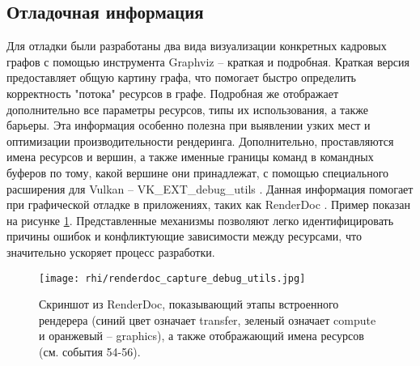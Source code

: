 \subsection{Отладочная информация}
Для отладки были разработаны два вида визуализации конкретных кадровых графов с помощью инструмента Graphviz \cite{graphviz} -- краткая и подробная. Краткая версия предоставляет общую картину графа, что помогает быстро определить корректность "потока" ресурсов в графе. Подробная же отображает дополнительно все параметры ресурсов, типы их использования, а также барьеры. Эта информация особенно полезна при выявлении узких мест и оптимизации производительности рендеринга. Дополнительно, проставляются имена ресурсов и вершин, а также именные границы команд в командных буферов по тому, какой вершине они принадлежат, с помощью специального расширения для Vulkan -- VK\_EXT\_debug\_utils \cite{vulkan_ext_debug_utils}. Данная информация помогает при графической отладке в приложениях, таких как RenderDoc \cite{renderdoc}. Пример показан на рисунке \ref{fig:renderdoc_capture_debug_utils}. Представленные механизмы позволяют легко идентифицировать причины ошибок и конфликтующие зависимости между ресурсами, что значительно ускоряет процесс разработки.

\begin{figure}[h]
    \centering
    \texttt{[image: rhi/renderdoc\_capture\_debug\_utils.jpg]}
    \caption{Скриншот из RenderDoc, показывающий этапы встроенного рендерера (синий цвет означает transfer, зеленый означает compute и оранжевый -- graphics), а также отображающий имена ресурсов (см. события 54-56).}
    \label{fig:renderdoc_capture_debug_utils}
\end{figure}

